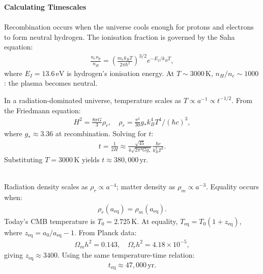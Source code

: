\begin{technical}
{\Large\textbf{Calculating Timescales}}\\[0.2em]

\\[0.25em]
Recombination occurs when the universe cools enough for protons and electrons to form neutral hydrogen. The ionisation fraction is governed by the Saha equation:
\begin{align*}
\frac{n_e n_p}{n_H} = \left(\frac{m_e k_B T}{2\pi\hbar^2}\right)^{3/2} e^{-E_I/k_B T},
\end{align*}
where \(E_I = 13.6\,\text{eV}\) is hydrogen's ionisation energy. At \(T \sim 3000\,\text{K}\), \(n_H/n_e \sim 1000\): the plasma becomes neutral. 

In a radiation-dominated universe, temperature scales as \(T \propto a^{-1} \propto t^{-1/2}\). From the Friedmann equation:
\begin{align*}
H^2 = \frac{8\pi G}{3}\rho_r, \quad \rho_r = \frac{\pi^2}{30}g_* k_B^4 T^4/(\hbar c)^3,
\end{align*}
where \(g_* \approx 3.36\) at recombination. Solving for \(t\):
\begin{align*}
t = \frac{1}{2H} \approx \frac{\sqrt{45}}{4\sqrt{2\pi^3 G g_*}} \frac{\hbar c}{k_B^2 T^2}.
\end{align*}
Substituting \(T = 3000\,\text{K}\) yields \(t \approx 380{,}000\,\text{yr}\).

\\[0.25em]
Radiation density scales as \(\rho_r \propto a^{-4}\); matter density as \(\rho_m \propto a^{-3}\). Equality occurs when:
\begin{align*}
\rho_r(a_{\text{eq}}) = \rho_m(a_{\text{eq}}).
\end{align*}
Today's CMB temperature is \(T_0 = 2.725\,\text{K}\). At equality, \(T_{\text{eq}} = T_0 (1+z_{\text{eq}})\), where \(z_{\text{eq}} = a_0/a_{\text{eq}} - 1\). From Planck data:
\begin{align*}
\Omega_m h^2 = 0.143, \quad \Omega_r h^2 = 4.18 \times 10^{-5},
\end{align*}
giving \(z_{\text{eq}} \approx 3400\). Using the same temperature-time relation:
\begin{align*}
t_{\text{eq}} \approx 47{,}000\,\text{yr}.
\end{align*}


\end{technical}
